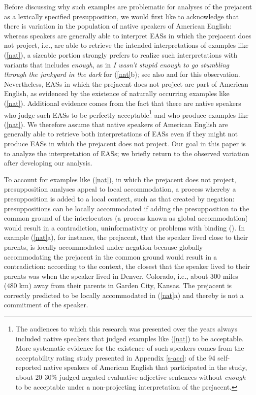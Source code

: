 \documentclass[11pt,fleqn]{article}
\newcommand{\6}{\mbox{$[\hspace*{-.6mm}[$}}
\newcommand{\9}{\mbox{$]\hspace*{-.6mm}]$}}
\begin{document}
Before discussing why such examples are problematic for analyses of the prejacent as a lexically specified presupposition, we would first like to acknowledge that there is variation in the population of native speakers of American English: whereas speakers are generally able to interpret EASs in which the prejacent does not project, i.e., are able to retrieve the intended interpretations of examples like (\ref{nat}), a sizeable portion strongly prefers to realize such interpretations with variants that includes {\em enough}, as in {\em I wasn't stupid enough to go stumbling through the junkyard in the dark} for (\ref{nat}b); see also \citealt{karttunen2013} and \citealt{karttunen-etal2014} for this observation. Nevertheless, EASs in which the prejacent does not project are part of American English, as evidenced by the existence of naturally occurring examples like (\ref{nat}). Additional evidence comes from the fact that there are native speakers who judge such EASs to be perfectly acceptable\footnote{The audiences to which this research was presented over the years always included native speakers that judged examples like (\ref{nat}) to be acceptable. More systematic evidence for the existence of such speakers comes from the acceptability rating study presented in Appendix \ref{s-acc}: of the 94 self-reported native speakers of American English that participated in the study, about 20-30\% judged negated evaluative adjective sentences without {\em enough} to be acceptable under a non-projecting interpretation of the prejacent.} and who produce examples like (\ref{nat}). We therefore assume that native speakers of American English are generally able to retrieve both interpretations of EASs even if they might not produce EASs in which the prejacent does not project. Our goal in this paper is to analyze the interpretation of EASs; we briefly return to the observed variation after developing our analysis.

To account for examples like (\ref{nat}), in which the prejacent does not project, presupposition analyses appeal to local accommodation, a process whereby a presupposition is added to a local context, such as that created by negation: presuppositions can be locally accommodated if adding the presupposition to the common ground of the interlocutors (a process known as global accommodation) would result in a contradiction, uninformativity or problems with
binding (\citealt{heim82,vds92}). In example (\ref{nat}a), for instance, the prejacent, that the speaker lived close to their parents, is locally accommodated under negation because globally accommodating the prejacent in the common ground would result in a contradiction: 
according to the context, the closest that the speaker lived to their parents was when the speaker lived in Denver, Colorado, i.e., about 300 miles (480 km) away from their parents in Garden City, Kansas. The prejacent is correctly predicted to be locally accommodated in (\ref{nat}a) and thereby is not a commitment of the speaker.
\end{document}
